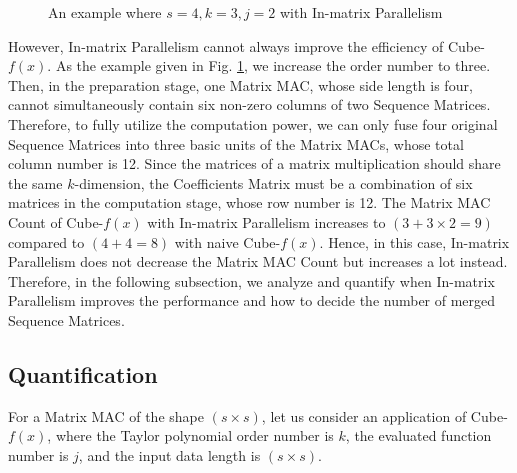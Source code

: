 \documentclass[12pt]{extbook}
\begin{document}
\begin{figure}[t]
    \caption{An example where $s = 4, k = 3, j = 2$ with In-matrix Parallelism}
    \label{fig:parallel_1}
    \end{figure}

However, In-matrix Parallelism cannot always improve the efficiency of Cube-$f(x)$. As the example given in Fig. \ref{fig:parallel_1}, we increase the order number to three. Then, in the preparation stage, one Matrix MAC, whose side length is four, cannot simultaneously contain six non-zero columns of two Sequence Matrices. Therefore, to fully utilize the computation power, we can only fuse four original Sequence Matrices into three basic units of the Matrix MACs, whose total column number is 12. Since the matrices of a matrix multiplication should share the same $k$-dimension, the Coefficients Matrix must be a combination of six matrices in the computation stage, whose row number is 12. The Matrix MAC Count of Cube-$f(x)$ with In-matrix Parallelism increases to $(3 + 3 \times 2 = 9)$ compared to $(4 + 4 = 8)$ with naive Cube-$f(x)$. Hence, in this case, In-matrix Parallelism does not decrease the Matrix MAC Count but increases a lot instead. Therefore, in the following subsection, we analyze and quantify when In-matrix Parallelism improves the performance and how to decide the number of merged Sequence Matrices.

\subsection{Quantification \label{sec:qua}}

For a Matrix MAC of the shape $(s \times s)$, let us consider an application of Cube-$f(x)$, where the Taylor polynomial order number is $k$, the evaluated function number is $j$, and the input data length is $(s \times s)$. 
\end{document}
